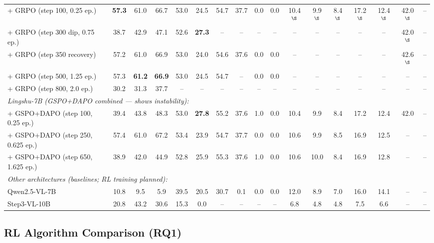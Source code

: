 \documentclass{article}
\begin{document}
\begin{table}[t]
{\begin{tabular}{l|ccc|cccccc|ccccc|cc}
+ GRPO (step 100, 0.25 ep.) & \textbf{57.3} & 61.0 & 66.7 & 53.0 & 24.5 & 54.7 & 37.7 & 0.0 & 0.0 & 10.4$^\S$ & 9.9$^\S$ & 8.4$^\S$ & 17.2$^\S$ & 12.4$^\S$ & 42.0$^\S$ & -- \\
+ GRPO (step 300 dip, 0.75 ep.) & 38.7 & 42.9 & 47.1 & 52.6 & \textbf{27.3} & -- & -- & -- & -- & -- & -- & -- & -- & -- & 42.0$^\S$ & -- \\
+ GRPO (step 350 recovery) & 57.2 & 61.0 & 66.9 & 53.0 & 24.0 & 54.6 & 37.6 & 0.0 & 0.0 & -- & -- & -- & -- & -- & 42.6$^\S$ & -- \\
+ GRPO (step 500, 1.25 ep.) & 57.3 & \textbf{61.2} & \textbf{66.9} & 53.0 & 24.5 & 54.7 & -- & 0.0 & 0.0 & -- & -- & -- & -- & -- & -- & -- \\
\rowcolor{red!10} + GRPO (step 800, 2.0 ep.) & 30.2 & 31.3 & 37.7 & -- & -- & -- & -- & -- & -- & -- & -- & -- & -- & -- & -- & -- \\
\midrule
\multicolumn{17}{l}{\emph{Lingshu-7B (GSPO+DAPO combined --- shows instability):}} \\
+ GSPO+DAPO (step 100, 0.25 ep.) & 39.4 & 43.8 & 48.3 & 53.0 & \textbf{27.8} & 55.2 & 37.6 & 1.0 & 0.0 & 10.4 & 9.9 & 8.4 & 17.2 & 12.4 & 42.0 & -- \\
+ GSPO+DAPO (step 250, 0.625 ep.) & 57.4 & 61.0 & 67.2 & 53.4 & 23.9 & 54.7 & 37.7 & 0.0 & 0.0 & 10.6 & 9.9 & 8.5 & 16.9 & 12.5 & -- & -- \\
+ GSPO+DAPO (step 650, 1.625 ep.) & 38.9 & 42.0 & 44.9 & 52.8 & 25.9 & 55.3 & 37.6 & 1.0 & 0.0 & 10.6 & 10.0 & 8.4 & 16.9 & 12.8 & -- & -- \\
\midrule
\multicolumn{17}{l}{\emph{Other architectures (baselines; RL training planned):}} \\
Qwen2.5-VL-7B & 10.8 & 9.5 & 5.9 & 39.5 & 20.5 & 30.7 & 0.1 & 0.0 & 0.0 & 12.0 & 8.9 & 7.0 & 16.0 & 14.1 & -- & -- \\
Step3-VL-10B & 20.8 & 43.2 & 30.6 & 15.3 & 0.0 & -- & -- & -- & -- & 6.8 & 4.8 & 4.8 & 7.5 & 6.6 & -- & -- \\
\bottomrule
\end{tabular}
}
\end{table}

\subsection{RL Algorithm Comparison (RQ1)}
\end{document}

